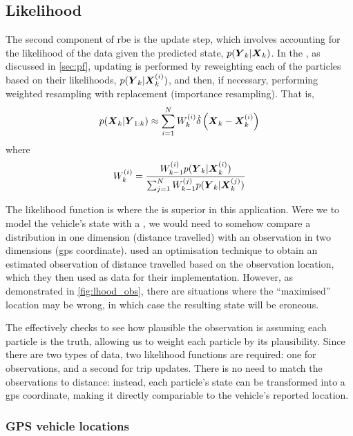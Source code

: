 \subsection{Likelihood}
\label{sec:pf-likelihood}

The second component of \gls{rbe} is the update step, which involves accounting for the likelihood of the data given the predicted state, $p(\boldsymbol{Y}_k | \boldsymbol{X}_k)$. In the \pf{}, as discussed in \cref{sec:pf}, updating is performed by reweighting each of the particles based on their likelihoods, $p(\boldsymbol{Y}_k | \boldsymbol{X}^{(i)}_k)$, and then, if necessary, performing weighted resampling with replacement (importance resampling). That is,
\begin{equation}
\label{eq:vehicle_pf_update}
p(\Vstate_k | \Vobs_{1:k}) \approx
\sum_{i=1}^\Np
    \Pwt_{k}
    \dirac\left(
        \Vstate_k - \Vstate\vi_k
    \right)
\end{equation}
where
\begin{equation}
\label{eq:vehicle_pf_reweight}
\Pwt_k = \frac{
    \Pwt_{k-1} p(\Vobs_k | \Vstate\vi_k)
}{
    \sum_{j=1}^\Np \Pwt[j]_{k-1} p(\Vobs_k | \Vstate\vi[j]_k)
}
\end{equation}


The likelihood function is where the \pf{} is superior in this application. Were we to model the vehicle's state with a \kf{}, we would need to somehow compare a distribution in one dimension (distance travelled) with an observation in two dimensions (\gls{gps} coordinate). \cite{Cathey_2003} used an optimisation technique to obtain an estimated observation of distance travelled based on the observation location, which they then used as data for their \kf{} implementation. However, as demonstrated in \cref{fig:lhood_obs}, there are situations where the ``maximised'' location may be wrong, in which case the resulting state will be eroneous.


The \pf{} effectively checks to see how plausible the observation is assuming each particle is the truth, allowing us to weight each particle by its plausibility. Since there are two types of data, two likelihood functions are required: one for \GPS{} observations, and a second for trip updates. There is no need to match the observations to distance: instead, each particle's state can be transformed into a \gls{gps} coordinate, making it directly compariable to the vehicle's reported location.


\subsubsection{GPS vehicle locations}
\label{sec:lhood_gps}

